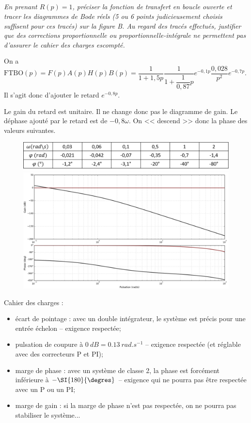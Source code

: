 \subparagraph{\label{q_16}}\textit{En prenant $R(p) = 1$, préciser la fonction de transfert en boucle ouverte et tracer les diagrammes de
Bode réels (5 ou 6 points judicieusement choisis suffisent pour ces tracés) sur la figure B. Au regard des tracés
effectués, justifier que des corrections proportionnelle ou proportionnelle-intégrale ne permettent pas d’assurer
le cahier des charges escompté.}
\ifprof
\begin{corrige}
On a $\text{FTBO}(p)=F(p)A(p)H(p)B(p)=\dfrac{1}{1 + 1,5p} \dfrac{1}{1+\dfrac{1}{0,87}p}e^{-0,1 p}  \dfrac{0,028}{p^2} e^{-0,7p}$. Il s'agit donc d'ajouter le retard $e^{-0,8 p}$.

Le gain du retard est unitaire. Il ne change donc pas le diagramme de gain.
Le déphase ajouté par le retard est de $-0,8\omega $. 
On << descend >> donc la phase des valeurs suivantes. 

\begin{figure}[H]
\centering
\includegraphics[width=.8\linewidth]{images/cor_q16}
\includegraphics[width=.8\linewidth]{images/cor_q16_bode}
\end{figure}

Cahier des charges :
\begin{itemize}
\item écart de pointage : avec un double intégrateur, le système est précis pour une entrée échelon -- exigence respectée;
\item pulsation de coupure à $\SI{0}{dB}= \SI{0,13}{rad.s^{-1}}$ -- exigence respectée (et réglable avec des correcteurs P et PI);
\item marge de phase : avec un système de classe 2, la phase est forcément inférieure à $-\SI{180}{\degres}$ -- exigence qui ne pourra pas être respectée avec un P ou un PI;
\item marge de gain : si la marge de phase n'est pas respectée, on ne pourra pas stabiliser le système...
\end{itemize}

\end{corrige}
\else
\fi


